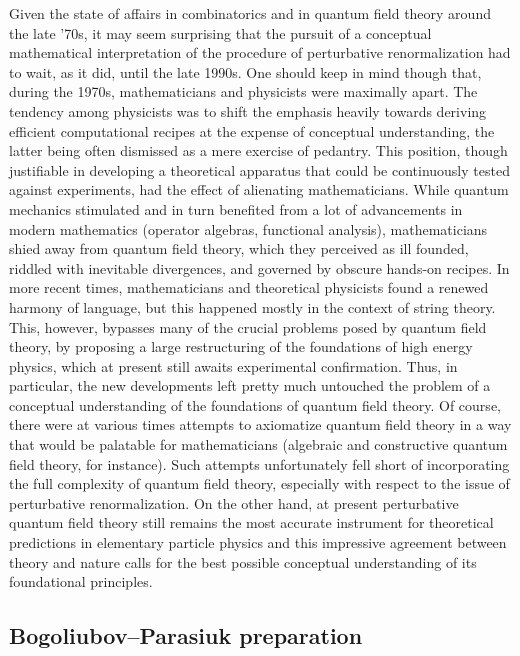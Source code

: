 \documentclass[10pt]{amsart}
\numberwithin{equation}{section}
\begin{document}
\smallskip

Given the  state of affairs in combinatorics and in quantum field
theory around the late '70s, it may seem surprising that the
pursuit of a conceptual mathematical interpretation of the
procedure of perturbative renormalization had to wait, as it did,
until the late 1990s. One should keep in mind though that, during
the 1970s, mathematicians and physicists were maximally apart. The
tendency among physicists was to shift the emphasis heavily
towards deriving efficient computational recipes at the expense of
conceptual understanding, the latter being often dismissed as a
mere exercise of pedantry. This position, though justifiable in
developing a theoretical apparatus that could be continuously
tested against experiments, had the effect of alienating
mathematicians. While quantum mechanics stimulated and in turn
benefited from a lot of advancements in modern mathematics
(operator algebras, functional analysis), mathematicians shied
away from quantum field theory, which they perceived as ill
founded, riddled with inevitable divergences, and governed by
obscure hands-on recipes. In more recent times, mathematicians and
theoretical physicists found a renewed harmony of language, but
this happened mostly in the context of string theory. This,
however, bypasses many of the crucial problems posed by quantum
field theory, by proposing a large restructuring of the
foundations of high energy physics, which at present still awaits
experimental confirmation. Thus, in particular, the new
developments left pretty much untouched the problem of a
conceptual understanding of the foundations of quantum field
theory. Of course, there were at various times attempts to
axiomatize quantum field theory in a way that would be palatable
for mathematicians (algebraic and constructive quantum field
theory, for instance). Such attempts unfortunately fell short of
incorporating the full complexity of quantum field theory,
especially with respect to the issue of perturbative
renormalization. On the other hand, at present perturbative
quantum field theory still remains the most accurate instrument
for theoretical predictions in elementary particle physics and
this impressive agreement between theory and nature calls for the
best possible conceptual understanding of its foundational
principles.


\medskip
\subsection*{Bogoliubov--Parasiuk preparation}\hfill\medskip
\end{document}
